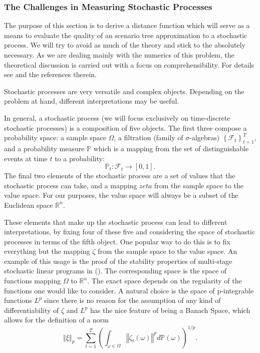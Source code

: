 \documentclass[a4paper, 12pt] {article}
\begin{document}
\subsubsection{The Challenges in Measuring Stochastic Processes}
The purpose of this section is to derive a distance function which will serve as a means to evaluate the quality of an scenario tree approximation to a stochastic process. We will try to avoid as much of the theory and stick to the absolutely necessary. As we are dealing mainly with the numerics of this problem, the theoretical discussion is carried out with a focus on comprehensibility. For details see \cite{Heitsch2010} and the references therein.

Stochastic processes are very versatile and complex objects. Depending on the problem at hand, different interpretations may be useful. 

In general, a stochastic process (we will focus exclusively on time-discrete stochastic processes) is a composition of five objects. The first three compose a probability space: a sample space $\Omega$, a filtration (family of $\sigma$-algebras) $\left\{\mathcal{F}_t\right\}_{t=1}^T$, and a probability measure $\mathbb{P}$ which is a mapping from the set of distinguishable events at time $t$ to a probability:
\begin{equation}
  \label{eq:prob_measure_definition}
  \mathbb{P}_t : \mathcal{F}_t \rightarrow \left[0,1\right].
\end{equation}
The final two elements of the stochastic process are a set of values that the stochastic process can take, and a mapping $zeta$ from the sample space to the value space. For our purposes, the value space will always be a subset of the Euclidean space $\mathbb{R}^n$.

These elements that make up the stochastic process can lead to different interpretations, by fixing four of these five and considering the space of stochastic processes in terms of the fifth object. One popular way to do this is to fix everything but the mapping $\zeta$ from the sample space to the value space. An example of this usage is the proof of the stability properties of multi-stage stochastic linear programs in (\cite{Heitsch2010}). The corresponding space is the space of functions mapping $\Omega$ to $\mathbb{R}^n$. The exact space depends on the regularity of the functions one would like to consider. A natural choice is the space of p-integrable functions $L^p$ since there is no reason for the assumption of any kind of differentiability of $\zeta$ and $L^p$ has the nice feature of being a Banach Space, which allows for the definition of a norm
\begin{equation}
  \label{eq:Lp-norm}
  \left\Vert\xi\right\Vert_p = \sum_{t=1}^T\left(\int_{\omega\in \Omega}\left\Vert\zeta_t(\omega)\right\Vert^p d\mathbb{P}(\omega)\right)^{1/p}.
\end{equation}
\end{document}

